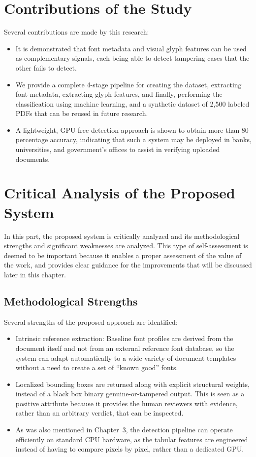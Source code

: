\section{Contributions of the Study}

Several contributions are made by this research:

\begin{itemize}
   \item It is demonstrated that font metadata and visual glyph features can be used as complementary signals, each being able to detect tampering cases that the other fails to detect.
   \item We provide a complete 4-stage pipeline for creating the dataset, extracting font metadata, extracting glyph features, and finally, performing the classification using machine learning, and a synthetic dataset of 2,500 labeled PDFs that can be reused in future research.
   \item A lightweight, GPU-free detection approach is shown to obtain more than 80 percentage accuracy, indicating that such a system may be deployed in banks, universities, and government's offices to assist in verifying uploaded documents.
\end{itemize}

\section{Critical Analysis of the Proposed System}

In this part, the proposed system is critically analyzed and its methodological strengths and significant weaknesses are analyzed. This type of self-assessment is deemed to be important because it enables a proper assessment of the value of the work, and provides clear guidance for the improvements that will be discussed later in this chapter.

\subsection{Methodological Strengths}

Several strengths of the proposed approach are identified:

\begin{itemize}
    \item Intrinsic reference extraction: Baseline font profiles are derived from the document itself and not from an external reference font database, so the system can adapt automatically to a wide variety of document templates without a need to create a set of “known good” fonts.
    \item Localized bounding boxes are returned along with explicit structural weights, instead of a black box binary genuine-or-tampered output. This is seen as a positive attribute because it provides the human reviewers with evidence, rather than an arbitrary verdict, that can be inspected.
    \item As was also mentioned in Chapter~3, the detection pipeline can operate efficiently on standard CPU hardware, as the tabular features are engineered instead of having to compare pixels by pixel, rather than a dedicated GPU.
\end{itemize}

